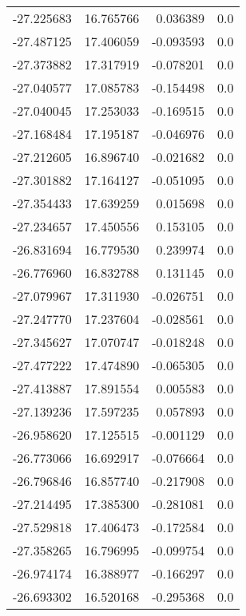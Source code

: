 \begin{tabular}{rrrr}
      -27.225683 &        16.765766 &    0.036389 &   0.0 \\
      -27.487125 &        17.406059 &   -0.093593 &   0.0 \\
      -27.373882 &        17.317919 &   -0.078201 &   0.0 \\
      -27.040577 &        17.085783 &   -0.154498 &   0.0 \\
      -27.040045 &        17.253033 &   -0.169515 &   0.0 \\
      -27.168484 &        17.195187 &   -0.046976 &   0.0 \\
      -27.212605 &        16.896740 &   -0.021682 &   0.0 \\
      -27.301882 &        17.164127 &   -0.051095 &   0.0 \\
      -27.354433 &        17.639259 &    0.015698 &   0.0 \\
      -27.234657 &        17.450556 &    0.153105 &   0.0 \\
      -26.831694 &        16.779530 &    0.239974 &   0.0 \\
      -26.776960 &        16.832788 &    0.131145 &   0.0 \\
      -27.079967 &        17.311930 &   -0.026751 &   0.0 \\
      -27.247770 &        17.237604 &   -0.028561 &   0.0 \\
      -27.345627 &        17.070747 &   -0.018248 &   0.0 \\
      -27.477222 &        17.474890 &   -0.065305 &   0.0 \\
      -27.413887 &        17.891554 &    0.005583 &   0.0 \\
      -27.139236 &        17.597235 &    0.057893 &   0.0 \\
      -26.958620 &        17.125515 &   -0.001129 &   0.0 \\
      -26.773066 &        16.692917 &   -0.076664 &   0.0 \\
      -26.796846 &        16.857740 &   -0.217908 &   0.0 \\
      -27.214495 &        17.385300 &   -0.281081 &   0.0 \\
      -27.529818 &        17.406473 &   -0.172584 &   0.0 \\
      -27.358265 &        16.796995 &   -0.099754 &   0.0 \\
      -26.974174 &        16.388977 &   -0.166297 &   0.0 \\
      -26.693302 &        16.520168 &   -0.295368 &   0.0 \\

\end{tabular}
